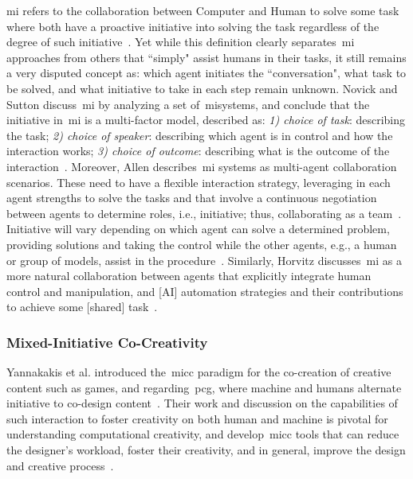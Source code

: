 \acrfull{mi} refers to the collaboration between Computer and Human to solve some task where both have a proactive initiative into solving the task regardless of the degree of such initiative~\cite{LiapisPhD}. Yet while this definition clearly separates~\acrshort{mi} approaches from others that ``simply" assist humans in their tasks, it still remains a very disputed concept as: which agent initiates the ``conversation", what task to be solved, and what initiative to take in each step remain unknown. Novick and Sutton discuss~\acrshort{mi} by analyzing a set of~\acrshort{mi}systems, and conclude that the initiative in~\acrshort{mi} is a multi-factor model, described as: \textit{1) choice of task}: describing the task; \textit{2) choice of speaker}: describing which agent is in control and how the interaction works; \textit{3) choice of outcome}: describing what is the outcome of the interaction~\cite{novick97-mixedInit}. Moreover, Allen describes~\acrshort{mi} systems as multi-agent collaboration scenarios. These need to have a flexible interaction strategy, leveraging in each agent strengths to solve the tasks and that involve a continuous negotiation between agents to determine roles, i.e., initiative; thus, collaborating as a team~\cite{Allen99-MIinteraction}. Initiative will vary depending on which agent can solve a determined problem, providing solutions and taking the control while the other agents, e.g., a human or group of models, assist in the procedure~\cite{Ferguson2007-MICollaborativeProbSolv}. Similarly, Horvitz discusses~\acrshort{mi} as a more natural collaboration between agents that explicitly integrate human control and manipulation, and [AI] automation strategies and their contributions to achieve some [shared] task~\cite{Horvitz99-uncertainty,Horvitz99-mixedInit}.


\subsubsection{Mixed-Initiative Co-Creativity}

Yannakakis et al. introduced the~\acrlong{micc} paradigm for the co-creation of creative content such as games, and regarding~\acrshort{pcg}, where machine and humans alternate initiative to co-design content~\cite{yannakakis2014micc}. Their work and discussion on the capabilities of such interaction to foster creativity on both human and machine is pivotal for understanding computational creativity, and develop~\acrshort{micc} tools that can reduce the designer's workload, foster their creativity, and in general, improve the design and creative process~\cite{liapis2016-canmixedinitiative,Alvarez2018a}.

